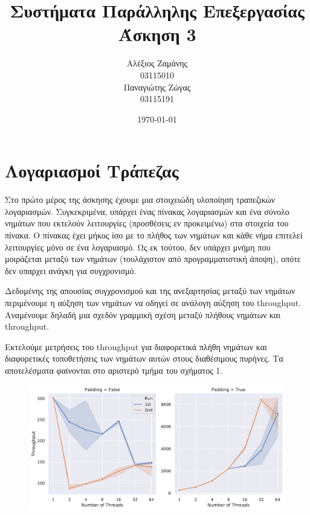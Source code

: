 \documentclass[12pt,titlepage]{article}
\begin{document}
\title{Συστήματα Παράλληλης Επεξεργασίας\\
    Άσκηση 3}
\author{Αλέξιος Ζαμάνης\\
    03115010\\
    Παναγιώτης Ζώγας\\
    03115191}
\date{\today}

\maketitle

\section{Λογαριασμοί Τράπεζας}

Στο πρώτο μέρος της άσκησης έχουμε μια στοιχειώδη υλοποίηση τραπεζικών
λογαριασμών. Συγκεκριμένα, υπάρχει ένας πίνακας λογαριασμών και ένα σύνολο
νημάτων που εκτελούν λειτουργίες (προσθέσεις εν προκειμένω) στα στοιχεία του
πίνακα. Ο πίνακας έχει μήκος ίσο με το πλήθος των νημάτων και κάθε νήμα επιτελεί
λειτουργίες μόνο σε ένα λογαριασμό. Ως εκ τούτου, δεν υπάρχει μνήμη που
μοιράζεται μεταξύ των νημάτων (τουλάχιστον από προγραμματιστική άποψη), οπότε
δεν υπαρχει ανάγκη για συγχρονισμό.

Δεδομένης της απουσίας συγχρονισμού και της ανεξαρτησίας μεταξύ των νημάτων
περιμένουμε η αύξηση των νημάτων να οδηγεί σε ανάλογη αύξηση του throughput.
Αναμένουμε δηλαδή μια σχεδόν γραμμική σχέση μεταξύ πλήθους νημάτων και
throughput.

Εκτελούμε μετρήσεις του throughput για διαφορετικά πλήθη νημάτων και
διαφορετικές τοποθετήσεις των νημάτων αυτών στους διαθέσιμους πυρήνες. Τα
αποτελέσματα φαίνονται στο αριστερό τμήμα του σχήματος 1.

\begin{figure}[h!]
    \includegraphics[width=\textwidth]{z1.pdf}
    \caption{}
\end{figure}
\end{document}
